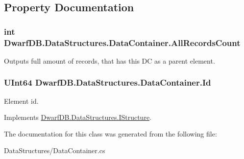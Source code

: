\subsection{Property Documentation}
\hypertarget{class_dwarf_d_b_1_1_data_structures_1_1_data_container_af2f2d766cbb2729f91effb3c68fd97e0}{
\subsubsection[{AllRecordsCount}]{\setlength{\rightskip}{0pt plus 5cm}int DwarfDB.DataStructures.DataContainer.AllRecordsCount}}
\label{class_dwarf_d_b_1_1_data_structures_1_1_data_container_af2f2d766cbb2729f91effb3c68fd97e0}


Outputs full amount of records, that has this DC as a parent element. 

\hypertarget{class_dwarf_d_b_1_1_data_structures_1_1_data_container_a3e5849e957860912c9050dbd84818dfd}{
\subsubsection[{Id}]{\setlength{\rightskip}{0pt plus 5cm}UInt64 DwarfDB.DataStructures.DataContainer.Id}}
\label{class_dwarf_d_b_1_1_data_structures_1_1_data_container_a3e5849e957860912c9050dbd84818dfd}


Element id. 



Implements \hyperlink{interface_dwarf_d_b_1_1_data_structures_1_1_i_structure_a9fab102fba11f70ab46272b53201784d}{DwarfDB.DataStructures.IStructure}.



The documentation for this class was generated from the following file:\begin{DoxyCompactItemize}
\item 
DataStructures/DataContainer.cs\end{DoxyCompactItemize}
